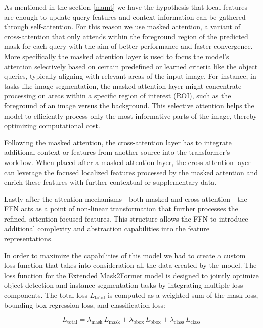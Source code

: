 \newpage
As mentioned in the section \ref{mamt} we have the hypothesis that local features are enough to update query features and context information can be 
gathered through self-attention. For this reason we use masked attention, a variant of cross-attention that only attends within the foreground region of 
the predicted mask for each query with the aim of better performance and faster convergence. More specifically the masked attention layer is used to focus 
the model’s attention selectively based on certain predefined or learned criteria like the object queries, typically aligning with relevant areas of the 
input image. For instance, in tasks like image segmentation, the masked attention layer might concentrate processing on areas within a specific region of 
interest (ROI), such as the foreground of an image versus the background. This selective attention helps the model to efficiently process only the most 
informative parts of the image, thereby optimizing computational cost.


Following the masked attention, the cross-attention layer has to integrate additional context or features from another source into the transformer’s workflow. 
When placed after a masked attention layer, the cross-attention layer can leverage the focused localized features processed by the masked attention and enrich 
these features with further contextual or supplementary data. 

Lastly after the attention mechanisms—both masked and cross-attention—the FFN acts as a point of non-linear transformation that further processes the refined, 
attention-focused features. This structure allows the FFN to introduce additional complexity and abstraction capabilities into the feature representations.


In order to maximize the capabilities of this model we had to create a custom loss function that takes into consideration all the data created by the model. 
The loss function for the Extended Mask2Former model is designed to jointly optimize object detection and instance segmentation tasks by integrating multiple 
loss components. The total loss \( L_{\text{total}} \) is computed as a weighted sum of the mask loss, bounding box regression loss, and classification loss:

\begin{equation}
    L_{\text{total}} = \lambda_{\text{mask}} \, L_{\text{mask}} + \lambda_{\text{bbox}} \, L_{\text{bbox}} + \lambda_{\text{class}} \, L_{\text{class}} \tag{9}    
\end{equation}

